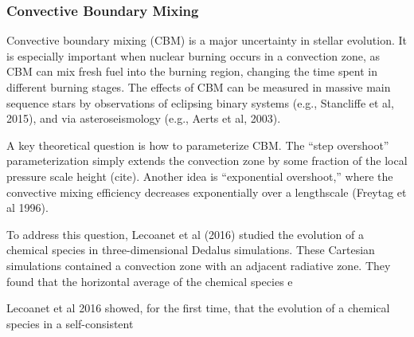{\color{purple}
\subsubsection{Convective Boundary Mixing}
}

Convective boundary mixing (CBM) is a major uncertainty in stellar evolution. It is especially important when nuclear burning occurs in a convection zone, as CBM can mix fresh fuel into the burning region, changing the time spent in different burning stages. The effects of CBM can be measured in massive main sequence stars by observations of eclipsing binary systems (e.g., Stancliffe et al, 2015), and via asteroseismology (e.g., Aerts et al, 2003).

A key theoretical question is how to parameterize CBM. The ``step overshoot'' parameterization simply extends the convection zone by some fraction of the local pressure scale height (cite). Another idea is ``exponential overshoot,'' where the convective mixing efficiency decreases exponentially over a lengthscale (Freytag et al 1996).

To address this question, Lecoanet et al (2016) studied the evolution of a chemical species in three-dimensional Dedalus simulations.  These Cartesian simulations contained a convection zone with an adjacent radiative zone. They found that the horizontal average of the chemical species e

Lecoanet et al 2016 showed, for the first time, that the evolution of a chemical species in a self-consistent 

